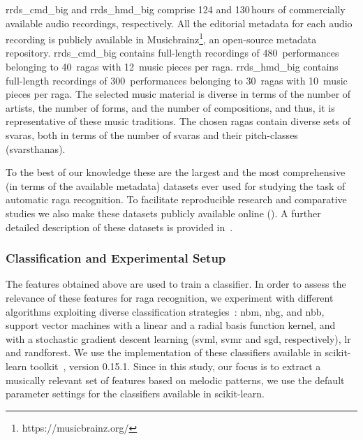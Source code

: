 \acrshort{rrds_cmd_big} and \acrshort{rrds_hmd_big} comprise 124 and 130\,hours of commercially available audio recordings, respectively. All the editorial metadata for each audio recording is publicly available in Musicbrainz\footnote{https://musicbrainz.org/}, an open-source metadata repository. \acrshort{rrds_cmd_big} contains full-length recordings of 480~performances belonging to 40~\glspl{raga} with 12~music pieces per \gls{raga}. \acrshort{rrds_hmd_big} contains full-length recordings of 300~performances belonging to 30~\glspl{raga} with 10~music pieces per \gls{raga}. The selected music material is diverse in terms of the number of artists, the number of forms, and the number of compositions, and thus,  it is representative of these music traditions. The chosen \glspl{raga} contain diverse sets of \glspl{svara}, both in terms of the number of \glspl{svara} and their pitch-classes (\glspl{svarsthana}).

To the best of our knowledge these are the largest and the most comprehensive (in terms of the available metadata) datasets ever used for studying the task of automatic \gls{raga} recognition. To facilitate reproducible research and comparative studies we also make these datasets publicly available online (). A further detailed description of these datasets is provided in~. 

\subsubsection{Classification and Experimental Setup}
\label{sec:raga_rec_pattern_classification_evaluation}

The features obtained above are used to train a classifier. In order to assess the relevance of these features for \gls{raga} recognition, we experiment with different algorithms exploiting diverse classification strategies~\citep{Hastie09BOOK}: \acrfull{nbm}, \acrfull{nbg}, and \acrfull{nbb}, support vector machines with a linear and a radial basis function kernel, and with a stochastic gradient descent learning (\acrshort{svml}, \acrshort{svmr} and \acrshort{sgd}, respectively), \acrfull{lr} and \acrfull{randforest}. We use the implementation of these classifiers available in scikit-learn toolkit~\citep{scikitlearn}, version 0.15.1. Since in this study, our focus is to extract a musically relevant set of features based on melodic patterns, we use the  default parameter settings for the classifiers available in scikit-learn. 

